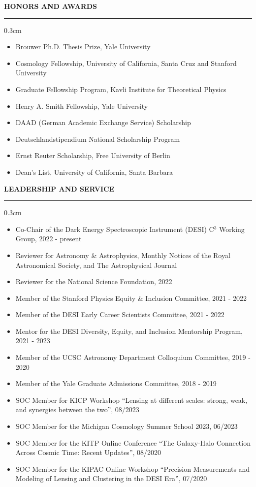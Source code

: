 \documentclass[12pt]{article}
\renewenvironment{section}[1]
  {
  \medskip
  {\color{yaleblue} \MakeUppercase{\bf #1}}
  \smallskip
  \hrule
  \medskip
  \begin{adjustwidth}{0.3cm}{}
  }
  {
  \end{adjustwidth}
  }
\begin{document}
\begin{section}{Honors and Awards}
  \begin{itemize}[leftmargin=0.5cm, topsep=0pt, itemsep=0pt, partopsep=0pt, parsep=0pt]
    \item Brouwer Ph.D. Thesis Prize, Yale University
    \item Cosmology Fellowship, University of California, Santa Cruz and Stanford University
    \item Graduate Fellowship Program, Kavli Institute for Theoretical Physics
    \item Henry A. Smith Fellowship, Yale University
    \item DAAD (German Academic Exchange Service) Scholarship
    \item Deutschlandstipendium National Scholarship Program
    \item Ernst Reuter Scholarship, Free University of Berlin
    \item Dean's List, University of California, Santa Barbara
  \end{itemize}
\end{section}

\begin{section}{Leadership and Service}
  \begin{itemize}[leftmargin=0.5cm, topsep=0pt, itemsep=0pt, partopsep=0pt, parsep=0pt]
    \item Co-Chair of the Dark Energy Spectroscopic Instrument (DESI) C$^3$ Working Group, 2022 - present
    \item Reviewer for Astronomy \& Astrophysics, Monthly Notices of the Royal Astronomical Society, and The Astrophysical Journal
    \item Reviewer for the National Science Foundation, 2022
    \item Member of the Stanford Physics Equity \& Inclusion Committee, 2021 - 2022
    \item Member of the DESI Early Career Scientists Committee, 2021 - 2022
    \item Mentor for the DESI Diversity, Equity, and Inclusion Mentorship Program, 2021 - 2023
    \item Member of the UCSC Astronomy Department Colloquium Committee, 2019 - 2020
    \item Member of the Yale Graduate Admissions Committee, 2018 - 2019
    \item SOC Member for KICP Workshop ``Lensing at different scales: strong, weak, and synergies between the two'', 08/2023
    \item SOC Member for the Michigan Cosmology Summer School 2023, 06/2023
    \item SOC Member for the KITP Online Conference ``The Galaxy-Halo Connection Across Cosmic Time: Recent Updates'', 08/2020
    \item SOC Member for the KIPAC Online Workshop ``Precision Measurements and Modeling of Lensing and Clustering in the DESI Era'', 07/2020
  \end{itemize}
\end{section}
\end{document}
